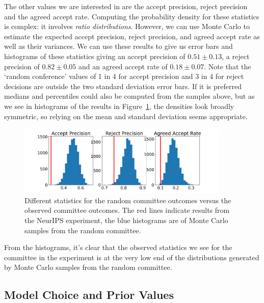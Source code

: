 The other values we are interested in are the accept precision, reject
precision and the agreed accept rate. Computing the probability density
for these statistics is complex: it involves \emph{ratio
distributions}. However, we can use Monte Carlo to estimate the expected
accept precision, reject precision, and agreed accept rate as well as
their variances. We can use these results to give us error bars and
histograms of these statistics giving an accept precision of \(0.51 \pm 0.13\), a reject precision of
\(0.82 \pm 0.05\) and an agreed accept rate of \(0.18 \pm 0.07\). Note
that the `random conference' values of 1 in 4 for accept precision and 3
in 4 for reject decisions are outside the two standard deviation error
bars. If it is preferred medians and percentiles could also be computed
from the samples above, but as we see in histograms  of the results in Figure~\ref{random-committee-outcomes},
the densities look broadly symmetric, so relying on the mean and standard deviation seems appropriate.

\begin{figure}[htb]
\centering
\includegraphics[width=0.90\textwidth]{diagrams/neurips/random-committee-outcomes-vs-true.pdf}


\caption{Different statistics for the random committee outcomes versus the observed committee outcomes. The red lines indicate results from the NeurIPS experiment, the blue histograms are of Monte Carlo samples from the random committee.}
\label{random-committee-outcomes}
\end{figure}

From the histograms, it's clear that the observed statistics we see for the committee in the experiment is at the very low end of the distributions generated by Monte Carlo samples from the random committee.

\subsection{Model Choice and Prior
Values}\label{model-choice-and-prior-values}


